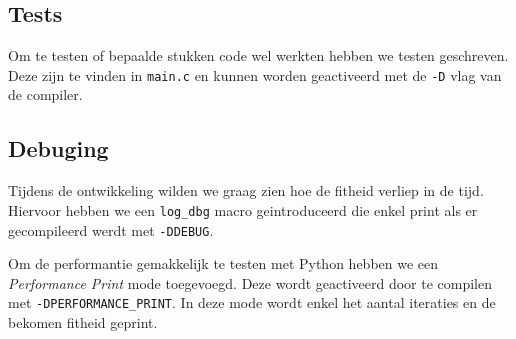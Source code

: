\subsection{Tests}
\label{sub:explain_tests}
Om te testen of bepaalde stukken code wel werkten hebben we testen geschreven. Deze zijn te vinden in \texttt{main.c} en kunnen worden geactiveerd met de \texttt{-D} vlag van de compiler.

\subsection{Debuging}
\label{sub:explain_debug_analyse}
Tijdens de ontwikkeling wilden we graag zien hoe de fitheid verliep in de tijd. Hiervoor hebben we een \texttt{log\_dbg} macro geintroduceerd die enkel print als er gecompileerd werdt met \texttt{-DDEBUG}.

Om de performantie gemakkelijk te testen met Python hebben we een {\em{Performance Print}} mode toegevoegd. Deze wordt geactiveerd door te compilen met  \texttt{-DPERFORMANCE\_PRINT}. In deze mode wordt enkel het aantal iteraties en de bekomen fitheid geprint.


%